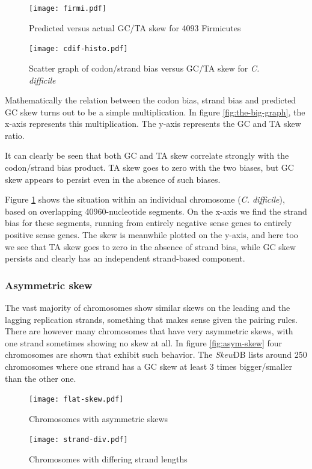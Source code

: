\documentclass[fleqn,10pt]{wlscirep}
\begin{document}
\begin{figure}[ht]
  \centering
    \begin{minipage}[b]{0.45\linewidth}
      \texttt{[image: firmi.pdf]}
      \caption{Predicted versus actual GC/TA skew for 4093 Firmicutes}
      \label{fig:the-big-graph}
    \end{minipage}
    \quad
    \begin{minipage}[b]{0.45\linewidth}
      \texttt{[image: cdif-histo.pdf]}
      \caption{Scatter graph of codon/strand bias versus GC/TA skew for \emph{C. difficile}}
      \label{fig:cdif-scatter}
    \end{minipage}
\end{figure}


Mathematically the relation between the codon bias, strand bias and predicted GC skew turns out to be a simple multiplication. In figure \ref{fig:the-big-graph}, the x-axis represents this multiplication. The y-axis represents the GC and TA skew ratio. 

It can clearly be seen that both GC and TA skew correlate strongly with the codon/strand bias product. TA skew goes to zero with the two biases, but GC skew appears to persist even in the absence of such biases.

Figure \ref{fig:cdif-scatter} shows the situation within an individual chromosome (\emph{C. difficile}), based on overlapping 40960-nucleotide segments. On the x-axis we find the strand bias for these segments, running from entirely negative sense genes to entirely positive sense genes. The skew is meanwhile plotted on the y-axis, and here too we see that TA skew goes to zero in the absence of strand bias, while GC skew persists and clearly has an independent strand-based component.

\subsubsection*{Asymmetric skew}
The vast majority of chromosomes show similar skews on the leading and the lagging replication strands, something that makes sense given the pairing rules. There are however many chromosomes that have very asymmetric skews, with one strand sometimes showing no skew at all. In figure \ref{fig:asym-skew} four chromosomes are shown that exhibit such behavior. The \emph{Skew}DB lists around 250 chromosomes where one strand has a GC skew at least 3 times bigger/smaller than the other one.

\begin{figure}[ht]
  \centering
  \begin{minipage}[b]{0.45\linewidth}
    \texttt{[image: flat-skew.pdf]}
    \caption{Chromosomes with asymmetric skews}
    \label{fig:asym-skew}
  \end{minipage}
  \quad
  \begin{minipage}[b]{0.45\linewidth}
    \texttt{[image: strand-div.pdf]}
    \caption{Chromosomes with differing strand lengths}
    \label{fig:strand-div}
  \end{minipage}
\end{figure}
\end{document}
